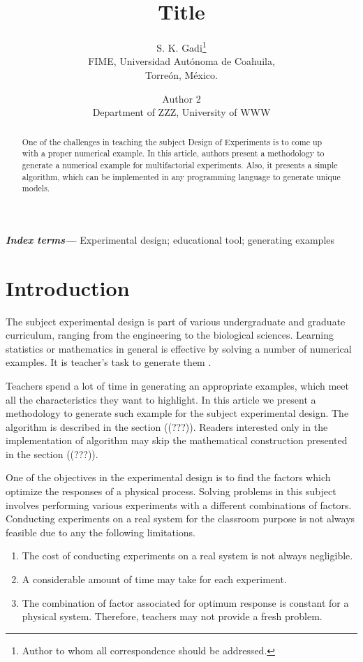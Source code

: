 \documentclass[letterpaper, 12pt]{article}
\title{\bf Title}
\author{S. K. Gadi\thanks{Author to whom all correspondence should be addressed.} \\
	FIME, Universidad Autónoma de Coahuila,\\ Torreón, México.
	\and
	Author 2 \\
	Department of ZZZ, University of WWW}
\providecommand{\keywords}[1]{\textbf{\textit{Index terms---}} #1}
\begin{document}
\maketitle
\begin{abstract}
	One of the challenges in teaching the subject Design of Experiments is to come up with a proper numerical example. In this article, authors present a methodology to generate a numerical example for multifactorial experiments. Also, it presents a simple algorithm, which can be implemented in any programming language to generate unique models.
\end{abstract}
\keywords{Experimental design; educational tool; generating examples}
\section{Introduction}
The subject experimental design is part of various undergraduate and graduate curriculum, ranging from the engineering to the biological sciences. Learning statistics or mathematics in general is effective by solving a number of numerical examples. It is teacher's task to generate them \cite{Deborah2008}.
\par
Teachers spend a lot of time in generating an appropriate examples, which meet all the characteristics they want to highlight. In this article we present a methodology to generate such example for the subject experimental design. The algorithm is described in the section ((???)). Readers interested only in the implementation of algorithm may skip the mathematical construction presented in the section ((???)).
\par
One of the objectives in the experimental design is to find the factors which optimize the responses of a physical process. Solving problems in this subject involves performing various experiments with a different combinations of factors. Conducting experiments on a real system for the classroom purpose is not always feasible due to any the following limitations.
\begin{enumerate}
	\item The cost of conducting experiments on a real system is not always negligible.
	\item A considerable amount of time may take for each experiment.
	\item The combination of factor associated for optimum response is constant for a physical system. Therefore, teachers may not provide a fresh problem.
\end{enumerate}
\par
\end{document}
